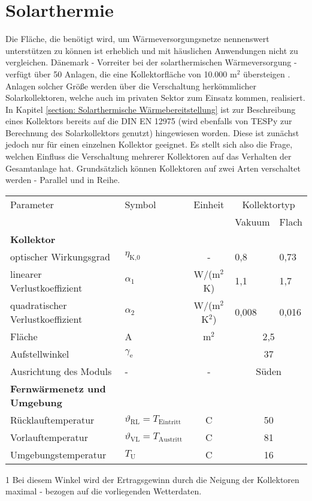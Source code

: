 \section{Solarthermie}\label{section: Modellbildung - Solarthermie}
Die Fläche, die benötigt wird, um Wärmeversorgungsnetze nennenswert unterstützen zu können ist erheblich und mit häuslichen Anwendungen nicht zu vergleichen. Dänemark - Vorreiter bei der solarthermischen Wärmeversorgung - verfügt über 50 Anlagen, die eine Kollektorfläche von 10.000 m$^2$ übersteigen \cite{SDH2019}. Anlagen solcher Größe werden über die Verschaltung herkömmlicher Solarkollektoren, welche auch im privaten Sektor zum Einsatz kommen, realisiert. In Kapitel \ref{section: Solarthermische Wärmebereitstellung} ist zur Beschreibung eines Kollektors bereits auf die DIN EN 12975 \cite{EN12975} (wird ebenfalls von \ac{TESPy} zur Berechnung des Solarkollektors genutzt) hingewiesen worden. Diese ist zunächst jedoch nur für einen einzelnen Kollektor geeignet. Es stellt sich also die Frage, welchen Einfluss die Verschaltung mehrerer Kollektoren auf das Verhalten der Gesamtanlage hat. Grundsätzlich können Kollektoren auf zwei Arten verschaltet werden - Parallel und in Reihe.
	\begin{center}
		\begin{threeparttable}
			\begin{tabular}{llcll}
				\hline 
				\rule{0pt}{12pt} Parameter  & Symbol  & Einheit  & \multicolumn{2}{c}{Kollektortyp}\tabularnewline
				& & & Vakuum & Flach \tabularnewline
				\hline 
				\textbf{Kollektor}  &  &  &  &\tabularnewline
				optischer Wirkungsgrad  & $\eta_\text{K,0}$ & - & 0,8 & 0,73 \tabularnewline
				linearer Verlustkoeffizient & $\alpha_1$  & W/(m$^2$K) & 1,1 & 1,7 \tabularnewline
				quadratischer Verlustkoeffizient & $\alpha_2$ & W/(m$^2$K$^2$) & 0,008 & 0,016 \tabularnewline
				Fläche & A & m$^2$ & \multicolumn{2}{c}{2,5}\tabularnewline
				Aufstellwinkel  & $\gamma_\text{e}$ & \textdegree & \multicolumn{2}{c}{37\tnote{1}}\tabularnewline
				Ausrichtung des Moduls  & - & - & \multicolumn{2}{c}{Süden} \tabularnewline
				\textbf{Fernwärmenetz und Umgebung}  &  &  &  &\tabularnewline
				Rücklauftemperatur  & $\vartheta_\text{RL} = T_\text{Eintritt}$  & \textdegree C  & \multicolumn{2}{c}{50} \tabularnewline
				Vorlauftemperatur & $\vartheta_\text{VL} = T_\text{Austritt}$ & \textdegree C & \multicolumn{2}{c}{81} \tabularnewline
				Umgebungstemperatur  & $T_\text{U}$ & \textdegree C & \multicolumn{2}{c}{16} \tabularnewline
				\hline
				
			\end{tabular}
			\begin{tablenotes}\footnotesize 
				\item[1] Bei diesem Winkel wird der Ertragsgewinn durch die Neigung der Kollektoren maximal - bezogen auf die vorliegenden Wetterdaten.
			\end{tablenotes}
		\end{threeparttable}
		\label{tab: verwendete Kollektordaten}
	\end{center} 

